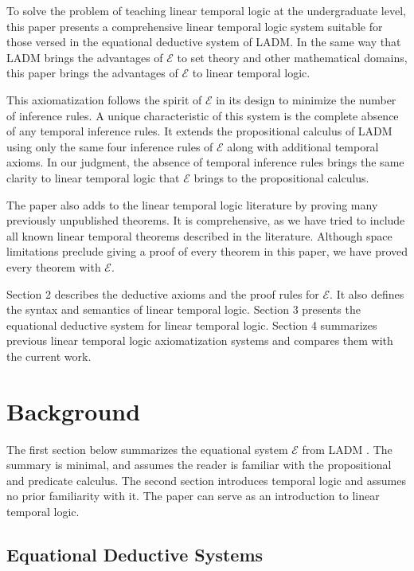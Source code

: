 \documentclass[12pt, fleqn, leqno]{article}
\begin{document}
To solve the problem of teaching linear temporal logic at the undergraduate level, this paper presents a comprehensive linear temporal logic system suitable for those versed in the equational deductive system of LADM.
In the same way that LADM brings the advantages of $\mathcal{E}$ to set theory and other mathematical domains, this paper brings the advantages of $\mathcal{E}$ to linear temporal logic.

This axiomatization follows the spirit of $\mathcal{E}$ in its design to minimize the number of inference rules.
A unique characteristic of this system is the complete absence of any temporal inference rules.
It extends the propositional calculus of LADM using only the same four inference rules of $\mathcal{E}$ along with additional temporal axioms.
In our judgment, the absence of temporal inference rules brings the same clarity to linear temporal logic that $\mathcal{E}$ brings to the propositional calculus.

The paper also adds to the linear temporal logic literature by proving many previously unpublished theorems.
It is comprehensive, as we have tried to include all known linear temporal theorems described in the literature.
Although space limitations preclude giving a proof of every theorem in this paper, we have proved every theorem with $\mathcal{E}$.

Section 2 describes the deductive axioms and the proof rules for $\mathcal{E}$.
It also defines the syntax and semantics of linear temporal logic.
Section 3 presents the equational deductive system for linear temporal logic.
Section 4 summarizes previous linear temporal logic axiomatization systems and compares them with the current work.

\section{Background}

The first section below summarizes the equational system $\mathcal{E}$ from LADM \cite{LADM}.
The summary is minimal, and assumes the reader is familiar with the propositional and predicate calculus.
The second section introduces temporal logic and assumes no prior familiarity with it.
The paper can serve as an introduction to linear temporal logic.

\subsection{Equational Deductive Systems}\label{sec-equational-deductive-systems}
\end{document}
